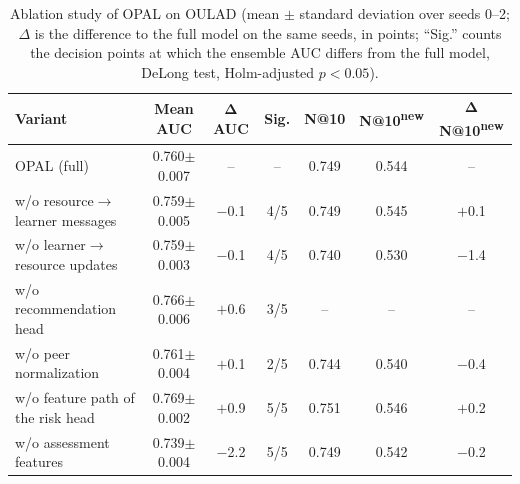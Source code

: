 \begin{table}[H]
\tablesize{\footnotesize}
\caption{Ablation study of OPAL on OULAD (mean $\pm$ standard deviation over seeds 0--2; $\Delta$ is the difference to the full model on the same seeds, in points; ``Sig.'' counts the decision points at which the ensemble AUC differs from the full model, DeLong test, Holm-adjusted $p<0.05$).}
\label{tab:ablation}
\setlength{\tabcolsep}{3pt}
\begin{tabularx}{\textwidth}{@{}lCCCCCC@{}}
\toprule
\textbf{Variant} & \textbf{Mean AUC} & $\boldsymbol{\Delta}$\textbf{AUC} & \textbf{Sig.} & \textbf{N@10} & \textbf{N@10}\textsuperscript{\textbf{new}} & $\boldsymbol{\Delta}$\textbf{N@10}\textsuperscript{\textbf{new}}\\
\midrule
OPAL (full) & 0.760$\pm$0.007 & -- & -- & 0.749 & 0.544 & --\\
w/o resource$\to$learner messages & 0.759$\pm$0.005 & $-$0.1 & 4/5 & 0.749 & 0.545 & $+$0.1\\
w/o learner$\to$resource updates & 0.759$\pm$0.003 & $-$0.1 & 4/5 & 0.740 & 0.530 & $-$1.4\\
w/o recommendation head & 0.766$\pm$0.006 & $+$0.6 & 3/5 & -- & -- & --\\
w/o peer normalization & 0.761$\pm$0.004 & $+$0.1 & 2/5 & 0.744 & 0.540 & $-$0.4\\
w/o feature path of the risk head & 0.769$\pm$0.002 & $+$0.9 & 5/5 & 0.751 & 0.546 & $+$0.2\\
w/o assessment features & 0.739$\pm$0.004 & $-$2.2 & 5/5 & 0.749 & 0.542 & $-$0.2\\
\bottomrule
\end{tabularx}
\end{table}
